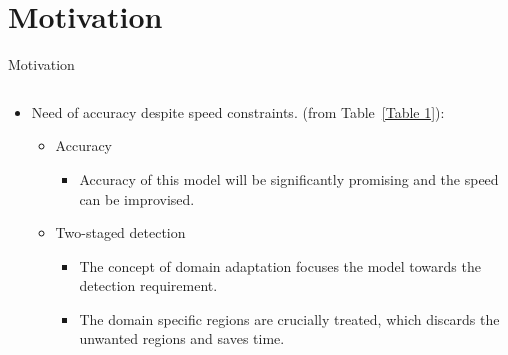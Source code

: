 \documentclass[10pt,aspectratio=169,t]{beamer}
\begin{document}
\newpage


\section{Motivation}
\begin{frame}{Motivation}
\begin{columns}
\begin{column}{1\textwidth}
\begin{itemize}
 \justifying
 \item Need of accuracy despite speed constraints.
 (from Table~\ref{Table 1}):
 \begin{itemize}
 \item Accuracy
 \begin{itemize}
  \item Accuracy of this model will be significantly promising and the speed can be improvised.
 \end{itemize}
 \item Two-staged detection
\begin{itemize}
  \item The concept of domain adaptation focuses the model towards the detection requirement. 
  \item The domain specific regions are crucially treated, which discards the unwanted regions and saves time.
 \end{itemize}
\end{itemize}

\end{itemize}
\end{column}
\end{columns}
\end{frame}

\newpage

\end{document}
